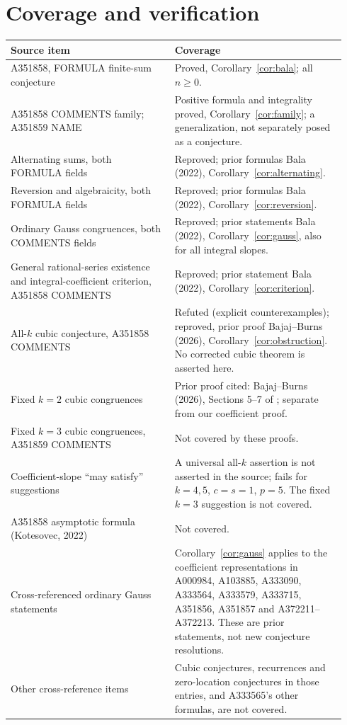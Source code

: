 \documentclass[11pt]{article}
\begin{document}
\section{Coverage and verification}
\small
\begin{longtable}{@{}>{\raggedright\arraybackslash}p{0.46\linewidth}>{\raggedright\arraybackslash}p{0.48\linewidth}@{}}
\toprule
Source item & Coverage\\
\midrule
\endhead
A351858, FORMULA finite-sum conjecture & Proved, Corollary~\ref{cor:bala}; all $n\geq0$.\\
A351858 COMMENTS family; A351859 NAME & Positive formula and integrality proved, Corollary~\ref{cor:family}; a generalization, not separately posed as a conjecture.\\
Alternating sums, both FORMULA fields & Reproved; prior formulas Bala (2022), Corollary~\ref{cor:alternating}.\\
Reversion and algebraicity, both FORMULA fields & Reproved; prior formulas Bala (2022), Corollary~\ref{cor:reversion}.\\
Ordinary Gauss congruences, both COMMENTS fields & Reproved; prior statements Bala (2022), Corollary~\ref{cor:gauss}, also for all integral slopes.\\
General rational-series existence and integral-coefficient criterion, A351858 COMMENTS & Reproved; prior statement Bala (2022), Corollary~\ref{cor:criterion}.\\
All-$k$ cubic conjecture, A351858 COMMENTS & Refuted (explicit counterexamples); reproved, prior proof Bajaj--Burns (2026), Corollary~\ref{cor:obstruction}. No corrected cubic theorem is asserted here.\\
Fixed $k=2$ cubic congruences & Prior proof cited: Bajaj--Burns (2026), Sections 5--7 of \cite{bb}; separate from our coefficient proof.\\
Fixed $k=3$ cubic congruences, A351859 COMMENTS & Not covered by these proofs.\\
Coefficient-slope ``may satisfy'' suggestions & A universal all-$k$ assertion is not asserted in the source; fails for $k=4,5$, $c=s=1$, $p=5$. The fixed $k=3$ suggestion is not covered.\\
A351858 asymptotic formula (Kotesovec, 2022) & Not covered.\\
Cross-referenced ordinary Gauss statements & Corollary~\ref{cor:gauss} applies to the coefficient representations in A000984, A103885, A333090, A333564, A333579, A333715, A351856, A351857 and A372211--A372213. These are prior statements, not new conjecture resolutions.\\
Other cross-reference items & Cubic conjectures, recurrences and zero-location conjectures in those entries, and A333565's other formulas, are not covered.\\
\bottomrule
\end{longtable}
\end{document}
